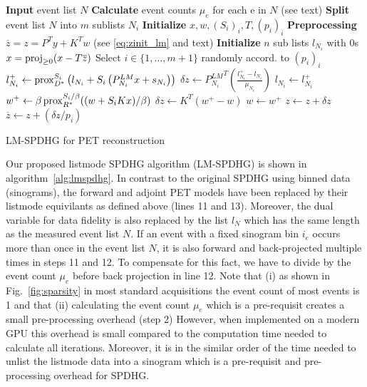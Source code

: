 \begin{algorithm}[t]
\begin{algorithmic}[1]
\small
\State \textbf{Input} event list $N$
\State \textbf{Calculate} event counts $\mu_e$ for each e in $N$ (see text)
\State \textbf{Split} event list $N$ into $m$ sublists $N_i$
\State \textbf{Initialize} $x,w,(S_i)_i,T,(p_i)_i$
\State \textbf{Preprocessing} $\overline{z} = z = P^T y + K^T w$ (see \eqref{eq:zinit_lm} and text)
\State \textbf{Initialize} $n$ sub lists $l_{N_i}$ with 0s
\Repeat
	\State $x = \operatorname{proj}_{\geq 0} (x - T \overline{z})$
	\State Select $i \in \{1,\ldots,m+1\}$ randomly accord. to $(p_i)_i$
	  \State $l_{N_i}^+ \gets \operatorname{prox}_{D^*}^{S_i} \left( l_{N_i} + S_i \left(P^{LM}_{N_i} x + s_{N_i} \right) \right)$
	  \State $\delta z \gets {P^{LM}_{N_i}}^T \left(\frac{l_{N_i}^+ - l_{N_i}}{\mu_{N_i}}\right)$
	  \State $l_{N_i} \gets l_{N_i}^+$
  \Else
	  \State $w^+ \gets \beta \operatorname{prox}_{R^*}^{S_i/\beta} ((w + S_i  K x)/\beta)$
	  \State $\delta z \gets K^T \left(w^+ - w\right)$
	  \State $w \gets w^+$
  \EndIf
	\State $z \gets z + \delta z$
	\State $\overline{z} \gets  z + (\delta z/p_i)$
\State {}
\end{algorithmic}
\caption{LM-SPDHG for PET reconstruction}
\label{alg:lmspdhg}
\end{algorithm}


Our proposed listmode SPDHG algorithm (LM-SPDHG) is shown in algorithm~\ref{alg:lmspdhg}.
In contrast to the original SPDHG using binned data (sinograms), the forward and adjoint
PET models have been replaced by their listmode equivilants as defined above (lines 11 and 13).
Moreover, the dual variable for data fidelity is also replaced by the list $l_N$ which has the
same length as the measured event list $N$.
If an event with a fixed sinogram bin $i_e$ occurs more than once in the event list
$N$, it is also forward and back-projected multiple times in steps 11 and 12.
To compensate for this fact, we have to divide by the event count $\mu_e$ before back projection
in line 12.
Note that (i) as shown in Fig.~\ref{fig:sparsity} in most standard acquisitions the event count
of most events is 1 and that (ii) calculating the event count $\mu_e$ which is a pre-requisit
creates a small pre-processing overhead (step 2)
However, when implemented on a modern GPU this overhead is small compared to the computation
time needed to calculate all iterations.
Moreover, it is in the similar order of the time needed to unlist the listmode data into
a sinogram which is a pre-requisit and pre-processing overhead for SPDHG.

